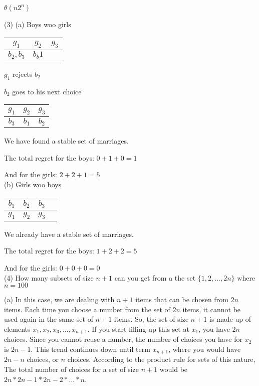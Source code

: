 \documentclass[]{article}
\begin{document}
$\theta(n2^n)$

\newpage 

\noindent (3) (a) Boys woo girls

\begin{tabular}{ c | c | c }
	$g_1$ & $g_2$ & $g_3$ \\ \hline
	$b_2, b_3$ & $b_b1$ & \\
\end{tabular}

$g_1$ rejects $b_2$

$b_2$ goes to his next choice \\

\begin{tabular}{ c | c | c }
	$g_1$ & $g_2$ & $g_3$ \\ \hline
	$b_3$ & $b_1$ & $b_2$ \\
\end{tabular}

We have found a stable set of marriages.

The total regret for the boys: $0+1+0 = 1$

And for the girls: $2+2+1 = 5$ \\

(b) Girls woo boys

\begin{tabular}{cl | c | c }
	$b_1$ & $b_2$ & $b_3$ \\ \hline
	$g_1$ & $g_2$ & $g_3$\\
\end{tabular}

We already have a stable set of marriages.

The total regret for the boys: $1+2+2 = 5$

And for the girls: $0+0+0 = 0$ \\

\noindent (4) How many subsets of size $n+1$ can you get from a the set $\{1,2,... ,2n\}$ where $n = 100$

(a) In this case, we are dealing with $n+1$ items that can be chosen from $2n$ items. Each time you choose a number from the set of $2n$ items, it cannot be used again in the same set of $n+1$ items. So, the set of size $n+1$ is made up of elements $x_1, x_2, x_3, ... , x_{n+1}$. If you start filling up this set at $x_1$, you have $2n$ choices. Since you cannot reuse a number, the number of choices you have for $x_2$ is $2n-1$. This trend continues down until term $x_{n+1}$, where you would have $2n - n$ choices, or $n$ choices. According to the product rule for sets of this nature, The total number of choices for a set of size $n+1$ would be \textbf{$2n * 2n-1 * 2n-2 * ... * n$}.
\end{document}
